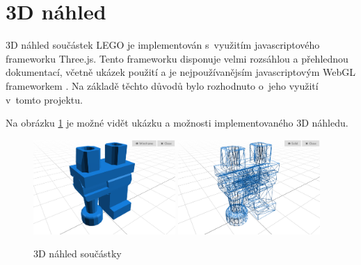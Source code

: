 \section{3D náhled}
3D náhled součástek LEGO je implementován s~využitím javascriptového frameworku Three.js. Tento frameworku disponuje velmi rozsáhlou a přehlednou dokumentací, včetně ukázek použití a je nejpoužívanějsím javascriptovým WebGL frameworkem \autocite{webgl-comparison}. Na základě těchto důvodů bylo rozhodnuto o~jeho využití v~tomto projektu.





Na obrázku \ref{obrazek-modelviewer} je možné vidět ukázku a možnosti implementovaného 3D náhledu.

\begin{figure}[htbp]
        \centering
        \includegraphics[width=0.48\textwidth,height=\textheight,keepaspectratio]{images/model-viewer-solid.png}
        \includegraphics[width=0.48\textwidth,height=\textheight,keepaspectratio]{images/model-viewer-wireframe.png}
        \caption{3D náhled součástky \label{obrazek-modelviewer}}
\end{figure}